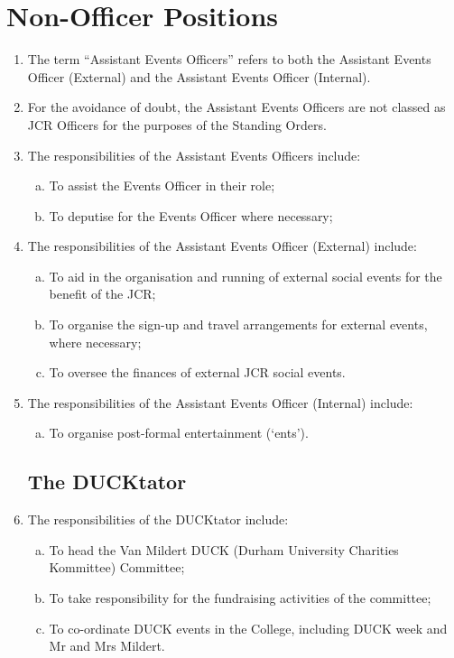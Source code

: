 \documentclass[12pt]{article}  %
\begin{document}
\section{Non-Officer Positions}
\begin{enumerate}
	\subsection{Assistant Events Officers}
	\item The term “Assistant Events Officers” refers to both the Assistant Events Officer (External) and the Assistant Events Officer (Internal).
	\item For the avoidance of doubt, the Assistant Events Officers are not classed as JCR Officers for the purposes of the Standing Orders.
	\item The responsibilities of the Assistant Events Officers include:
	\begin{enumerate}[(a)]
		\item To assist the Events Officer in their role;
		\item To deputise for the Events Officer where necessary;
	\end{enumerate}
	\item The responsibilities of the Assistant Events Officer (External) include:
	\begin{enumerate}[(a)]
		\item To aid in the organisation and running of external social events for the benefit of the JCR;
		\item To organise the sign-up and travel arrangements for external events, where necessary;
		\item To oversee the finances of external JCR social events.
	\end{enumerate}
	\item The responsibilities of the Assistant Events Officer (Internal) include:
	\begin{enumerate}[(a)]
		\item To organise post-formal entertainment (‘ents’).
	\end{enumerate}
	\subsection{The DUCKtator}
	\item The responsibilities of the DUCKtator include:
	\begin{enumerate}[(a)]
		\item To head the Van Mildert DUCK (Durham University Charities Kommittee) Committee;
		\item To take responsibility for the fundraising activities of the committee;
		\item To co-ordinate DUCK events in the College, including DUCK week and Mr and Mrs Mildert.
	\end{enumerate}

\end{enumerate}
\end{document}
